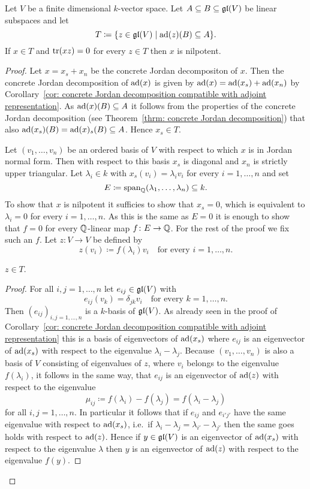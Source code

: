\begin{lem}\label{lem: Cartan's criterion technical lemma}
 Let $V$ be a finite dimensional $k$-vector space. Let $A \subseteq B \subseteq \mathfrak{gl}(V)$ be linear subspaces and let
 \[
  T \coloneqq \{z \in \mathfrak{gl}(V) \mid \operatorname{ad}(z)(B) \subseteq A\}.
 \]
 If $x \in T$ and $\operatorname{tr}(xz) = 0$ for every $z \in T$ then $x$ is nilpotent.
\end{lem}
\begin{proof}
 Let $x = x_s + x_n$ be the concrete Jordan decompositon of $x$. Then the concrete Jordan decomposition of $\operatorname{ad}(x)$ is given by $\operatorname{ad}(x) = \operatorname{ad}(x_s) + \operatorname{ad}(x_n)$ by Corollary~\ref{cor: concrete Jordan decomposition compatible with adjoint representation}. As $\operatorname{ad}(x)(B) \subseteq A$ it follows from the properties of the concrete Jordan decomposition (see Theorem~\ref{thrm: concrete Jordan decomposition}) that also $\operatorname{ad}(x_s)(B) = \operatorname{ad}(x)_s(B) \subseteq A$. Hence $x_s \in T$.
 
 Let $(v_1, \dotsc, v_n)$ be an ordered basis of $V$ with respect to which $x$ is in Jordan normal form. Then with respect to this basis $x_s$ is diagonal and $x_n$ is strictly upper triangular. Let $\lambda_i \in k$ with $x_s(v_i) = \lambda_i v_i$ for every $i = 1, \dotsc, n$ and set
 \[
  E \coloneqq \operatorname{span}_{\mathbb{Q}}(\lambda_1, \dotsc, \lambda_n) \subseteq k.
 \]
 To show that $x$ is nilpotent it sufficies to show that $x_s = 0$, which is equivalent to $\lambda_i = 0$ for every $i = 1, \dotsc, n$. As this is the same as $E = 0$ it is enough to show that $f = 0$ for every $\mathbb{Q}$-linear map $f \colon E \to \mathbb{Q}$. For the rest of the proof we fix such an $f$. Let $z \colon V \to V$ be defined by
 \[
  z(v_i) \coloneqq f(\lambda_i) v_i \quad \text{for every $i = 1, \dotsc, n$}.
 \]
 
 \begin{claim*}
  $z \in T$.
 \end{claim*}
 \begin{proof}
  For all $i,j = 1, \dotsc, n$ let $e_{ij} \in \mathfrak{gl}(V)$ with
  \[
   e_{ij}(v_k) = \delta_{jk} v_i \quad \text{for every $k = 1, \dotsc, n$}.
  \]
  Then $(e_{ij})_{i,j = 1, \dotsc, n}$ is a $k$-basis of $\mathfrak{gl}(V)$. As already seen in the proof of Corollary~\ref{cor: concrete Jordan decomposition compatible with adjoint representation} this is a basis of eigenvectors of $\operatorname{ad}(x_s)$ where $e_{ij}$ is an eigenvector of $\operatorname{ad}(x_s)$ with respect to the eigenvalue $\lambda_i - \lambda_j$. Because $(v_1, \dotsc, v_n)$ is also a basis of $V$ consisting of eigenvalues of $z$, where $v_i$ belongs to the eigenvalue $f(\lambda_i)$, it follows in the same way, that $e_{ij}$ is an eigenvector of $\operatorname{ad}(z)$ with respect to the eigenvalue
  \[
   \mu_{ij} \coloneqq f(\lambda_i) - f(\lambda_j) = f(\lambda_i - \lambda_j)
  \]
  for all $i,j = 1, \dotsc, n$. In particular it follows that if $e_{ij}$ and $e_{i'j'}$ have the same eigenvalue with respect to $\operatorname{ad}(x_s)$, i.e.\ if $\lambda_i - \lambda_j = \lambda_{i'} - \lambda_{j'}$ then the same goes holds with respect to $\operatorname{ad}(z)$. Hence if $y \in \mathfrak{gl}(V)$ is an eigenvector of $\operatorname{ad}(x_s)$ with respect to the eigenvalue $\lambda$ then $y$ is an eigenvector of $\operatorname{ad}(z)$ with respect to the eigenvalue $f(y)$.
  

\end{proof}
\end{proof}
